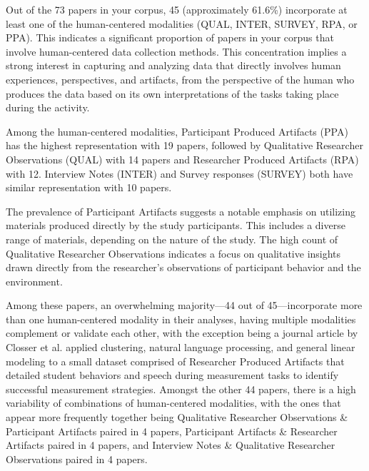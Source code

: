\documentclass[manuscript,screen,review]{acmart}
\begin{document}



Out of the 73 papers in your corpus, 45 (approximately 61.6\%) incorporate at least one of the human-centered modalities (QUAL, INTER, SURVEY, RPA, or PPA). This indicates a significant proportion of papers in your corpus that involve human-centered data collection methods. This concentration implies a strong interest in capturing and analyzing data that directly involves human experiences, perspectives, and artifacts, from the perspective of the human who produces the data based on its own interpretations of the tasks taking place during the activity.

Among the human-centered modalities, Participant Produced Artifacts (PPA) has the highest representation with 19 papers, followed by Qualitative Researcher Observations (QUAL) with 14 papers and Researcher Produced Artifacts (RPA) with 12. Interview Notes (INTER) and Survey responses (SURVEY) both have similar representation with 10 papers. 

The prevalence of Participant Artifacts suggests a notable emphasis on utilizing materials produced directly by the study participants. This includes a diverse range of materials, depending on the nature of the study. The high count of Qualitative Researcher Observations indicates a focus on qualitative insights drawn directly from the researcher's observations of participant behavior and the environment.

Among these papers, an overwhelming majority—44 out of 45—incorporate more than one human-centered modality in their analyses, having multiple modalities complement or validate each other, with the exception being a journal article by Closser et al. \cite{3809293172} applied clustering, natural language processing, and general linear modeling to a small dataset comprised of Researcher Produced Artifacts that detailed student behaviors and speech during measurement tasks to identify successful measurement strategies. Amongst the other 44 papers, there is a high variability of combinations of human-centered modalities, with the ones that appear more frequently together being Qualitative Researcher Observations \& Participant Artifacts paired in 4 papers, Participant Artifacts \& Researcher Artifacts paired in 4 papers, and Interview Notes \& Qualitative Researcher Observations paired in 4 papers.
\end{document}
